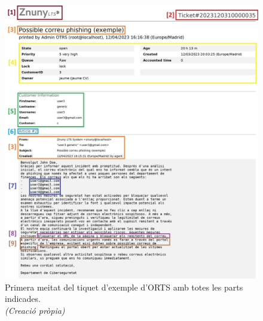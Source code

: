 \begin{figure}[H]
    \centering
    \includegraphics[width=\textwidth]{meitat-1.png}
    \caption{Primera meitat del tiquet d'exemple d'ORTS amb totes les parts indicades. \\ \textit{(Creació pròpia)}}
    \label{fig:tiquet-exemple-1}
\end{figure}


